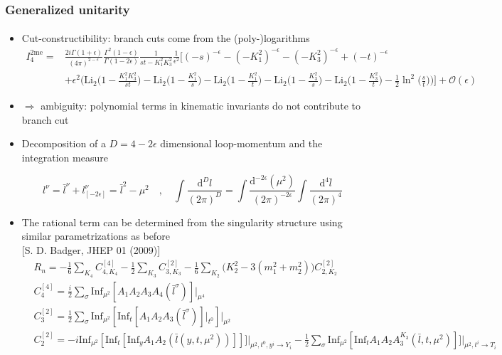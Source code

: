 \documentclass[english]{beamer}
\newcommand{\dd}{\textrm{d}}
\newcommand{\Inf}{\mathrm{Inf}}
\newcommand{\dilog}{\mathrm{Li}_2}
\begin{document}
\begin{frame}[shrink=20]
\frametitle{Generalized unitarity}
\framesubtitle{}
\begin{itemize}
\item<1-> Cut-constructibility: branch cuts come from the (poly-)logarithms
\tiny
\begin{equation*}
\begin{split}
I^{\mathrm{2me}}_4 = &\frac{2i\Gamma(1+\epsilon)}{(4\pi)^{2-\epsilon}}\frac{ \Gamma^2(1-\epsilon)}{\Gamma(1-2\epsilon)}\frac{1}{st-K_1^2K_3^2}\frac{1}{\epsilon^2}
\Big[
(-s)^{-\epsilon} - (-K_1^2)^{-\epsilon} - (-K_3^2)^{-\epsilon} + (-t)^{-\epsilon}
\\&
+\epsilon^2\Big(
\dilog\big(1-\frac{K_1^2K_3^2}{st}\big) 
-\dilog\big(1-\frac{K_1^2}{s}\big) 
-\dilog\big(1-\frac{K_1^2}{t}\big) 
-\dilog\big(1-\frac{K_3^2}{s}\big) 
-\dilog\big(1-\frac{K_3^2}{t}\big) 
-\frac{1}{2}\ln^2\big(\frac{s}{t}\big)
\Big)
\Big]
+\mathcal{O}(\epsilon)
\end{split}
\end{equation*}
\normalsize
\item<2->[]
$\Rightarrow$ ambiguity: polynomial terms in kinematic invariants do not contribute to branch cut

\item<3-> Decomposition of a $D=4-2\epsilon$ dimensional loop-momentum and the integration measure

\begin{equation*}
l^\nu = \bar{l}^\nu + l_{[-2\epsilon]}^\nu = \bar{l}^2 - \mu^2
\quad,\quad
\int\frac{\dd^D l}{(2\pi)^D} = 
\int\frac{\dd^{-2\epsilon}(\mu^2)}{(2\pi)^{-2\epsilon}}\int\frac{\dd^4 \bar{l}}{(2\pi)^4}
\end{equation*}

\item<4-> The rational term can be determined from the singularity structure using similar parametrizations as before\\
\tiny\color{blue}
[S. D. Badger, JHEP 01 (2009)]
\color{black}\small
\begin{equation*}
\begin{split}
& R_n = -\frac{1}{6}\sum_{K_4}C_{4,K_4}^{[4]} - \frac{1}{2}\sum_{K_3}C_{3,K_3}^{[2]} - 
\frac{1}{6}\sum_{K_2}\big(K_2^2 - 3(m_1^2 + m_2^2)\big)C_{2,K_2}^{[2]}
\\
& C_4^{[4]} = \frac{i}{2}\sum_{\sigma}\Inf_{\mu^2}[A_1A_2A_3A_4(\bar{l}^\sigma)]\big|_{\mu^4}
\\
& C_3^{[2]} = \frac{1}{2}\sum_\sigma\Inf_{\mu^2}[\Inf_t[A_1A_2A_3(\bar{l}^\sigma)]\big|_{t^0}]\big|_{\mu^2}
\\
& C_2^{[2]} = -i\Inf_{\mu^2}[\Inf_t[\Inf_y A_1 A_2(\bar{l}(y,t,\mu^2))]]]\big|_{\mu^2,t^0,y^i\rightarrow Y_i} -\frac{1}{2}\sum_{\sigma}\Inf_{\mu^2}[\Inf_tA_1A_2A_3^{K_3}(\bar{l}, t, \mu^2)]]\big|_{\mu^2,t^i\rightarrow T_i}
\end{split}
\end{equation*}

\end{itemize}

\end{frame}
\end{document}
